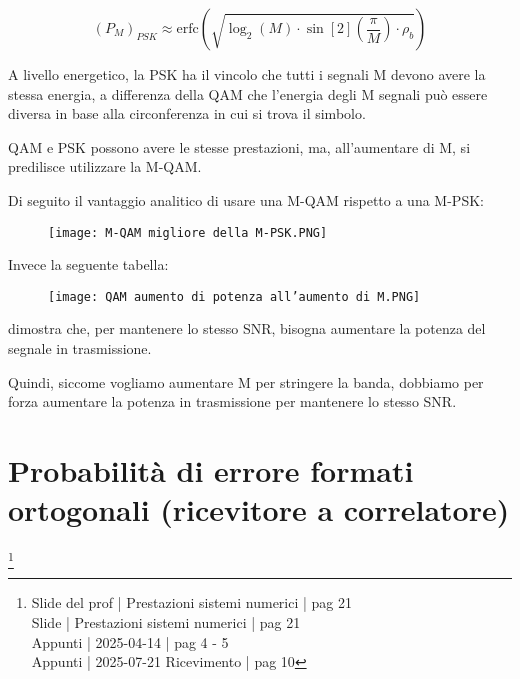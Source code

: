 {
    \Large 
    \begin{equation}
     \left(
            P_M
        \right)_{PSK}   
      \approx 
            \text{erfc} 
            \left(
                \sqrt{
                    \log_{2} (M) \cdot \sin[2](\frac{\pi}{M}) \cdot \rho_b
                }
            \right)  
    \end{equation}
}

A livello energetico, 
la PSK ha il vincolo che tutti i segnali M devono avere la stessa energia, 
a differenza della QAM che l'energia degli M segnali può essere diversa in base alla circonferenza in cui si trova il simbolo. \newline 

QAM e PSK possono avere le stesse prestazioni, 
ma, all'aumentare di M, si predilisce utilizzare la M-QAM. \newline 

Di seguito il vantaggio analitico di usare una M-QAM rispetto a una M-PSK: 

\begin{figure}[h]
    \centering
    \texttt{[image: M-QAM migliore della M-PSK.PNG]}
\end{figure}

Invece la seguente tabella: 

\begin{figure}[h]
    \centering
    \texttt{[image: QAM aumento di potenza all'aumento di M.PNG]}
\end{figure}

dimostra che, per mantenere lo stesso SNR, bisogna aumentare la potenza del segnale in trasmissione. \newline 

Quindi, siccome vogliamo aumentare M per stringere la banda, 
dobbiamo per forza aumentare la potenza in trasmissione 
per mantenere lo stesso SNR. \newline 

\newpage 

\section{Probabilità di errore formati ortogonali (ricevitore a correlatore)}
\footnote{Slide del prof | Prestazioni sistemi numerici | pag 21 \\
Slide | Prestazioni sistemi numerici | pag 21\\
Appunti | 2025-04-14 | pag 4 - 5 \\ 
Appunti | 2025-07-21 Ricevimento | pag 10
}

